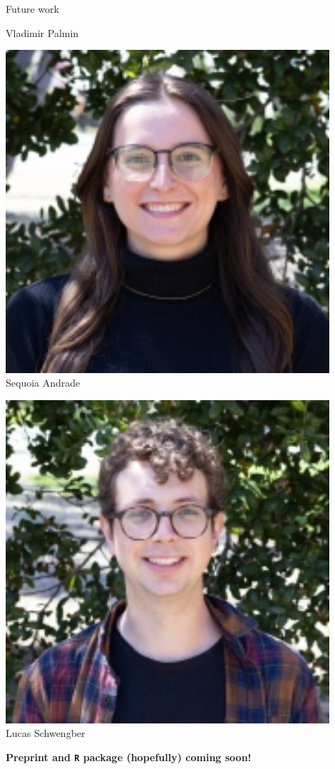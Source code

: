 \begin{frame}{Future work}
\begin{minipage}[t]{0.24\textwidth}
    Vladimir Palmin
\end{minipage}
\begin{minipage}[t]{0.24\textwidth}
    \centering
    \includegraphics[width=0.9\textwidth]{static_figures/sequoia.jpg}\\
    Sequoia Andrade
\end{minipage}
\begin{minipage}[t]{0.24\textwidth}
    \centering
\includegraphics[width=0.9\textwidth]{static_figures/lucas.jpg}\\
Lucas Schwengber
\end{minipage}

\hrulefill

\textbf{Preprint and \texttt{R} package (hopefully) coming soon!}


\end{frame}



